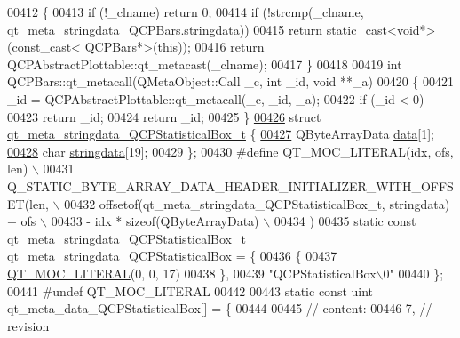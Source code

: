 \begin{DoxyCode}
00412 \{
00413     \textcolor{keywordflow}{if} (!\_clname) \textcolor{keywordflow}{return} 0;
00414     \textcolor{keywordflow}{if} (!strcmp(\_clname, qt\_meta\_stringdata\_QCPBars.\hyperlink{a00016_a07ece80e538a4239e2a3b6d4b9782407}{stringdata}))
00415         \textcolor{keywordflow}{return} \textcolor{keyword}{static\_cast<}\textcolor{keywordtype}{void}*\textcolor{keyword}{>}(\textcolor{keyword}{const\_cast<} QCPBars*\textcolor{keyword}{>}(\textcolor{keyword}{this}));
00416     \textcolor{keywordflow}{return} QCPAbstractPlottable::qt\_metacast(\_clname);
00417 \}
00418 
00419 \textcolor{keywordtype}{int} QCPBars::qt\_metacall(QMetaObject::Call \_c, \textcolor{keywordtype}{int} \_id, \textcolor{keywordtype}{void} **\_a)
00420 \{
00421     \_id = QCPAbstractPlottable::qt\_metacall(\_c, \_id, \_a);
00422     \textcolor{keywordflow}{if} (\_id < 0)
00423         \textcolor{keywordflow}{return} \_id;
00424     \textcolor{keywordflow}{return} \_id;
00425 \}
\hypertarget{a00016_source_l00426}{}\hyperlink{a00016}{00426} \textcolor{keyword}{struct }\hyperlink{a00016_d9/d4b/a00117}{qt\_meta\_stringdata\_QCPStatisticalBox\_t} \{
\hypertarget{a00016_source_l00427}{}\hyperlink{a00016_a5e26535af2751ed72a5c0a296eff07f6}{00427}     QByteArrayData \hyperlink{a00016_a5e26535af2751ed72a5c0a296eff07f6}{data}[1];
\hypertarget{a00016_source_l00428}{}\hyperlink{a00016_a69ea5a8754685d08ddf21f3f6478bb52}{00428}     \textcolor{keywordtype}{char} \hyperlink{a00016_a69ea5a8754685d08ddf21f3f6478bb52}{stringdata}[19];
00429 \};
00430 \textcolor{preprocessor}{#define QT\_MOC\_LITERAL(idx, ofs, len) \(\backslash\)}
00431 \textcolor{preprocessor}{    Q\_STATIC\_BYTE\_ARRAY\_DATA\_HEADER\_INITIALIZER\_WITH\_OFFSET(len, \(\backslash\)}
00432 \textcolor{preprocessor}{    offsetof(qt\_meta\_stringdata\_QCPStatisticalBox\_t, stringdata) + ofs \(\backslash\)}
00433 \textcolor{preprocessor}{        - idx * sizeof(QByteArrayData) \(\backslash\)}
00434 \textcolor{preprocessor}{    )}
00435 \textcolor{keyword}{static} \textcolor{keyword}{const} \hyperlink{a00016_d9/d4b/a00117}{qt\_meta\_stringdata\_QCPStatisticalBox\_t} 
      qt\_meta\_stringdata\_QCPStatisticalBox = \{
00436     \{
00437 \hyperlink{a00016_a75bb9482d242cde0a06c9dbdc6b83abe}{QT\_MOC\_LITERAL}(0, 0, 17)
00438     \},
00439     \textcolor{stringliteral}{"QCPStatisticalBox\(\backslash\)0"}
00440 \};
00441 \textcolor{preprocessor}{#undef QT\_MOC\_LITERAL}
00442 
00443 \textcolor{keyword}{static} \textcolor{keyword}{const} uint qt\_meta\_data\_QCPStatisticalBox[] = \{
00444 
00445  \textcolor{comment}{// content:}
00446        7,       \textcolor{comment}{// revision}

\end{DoxyCode}

